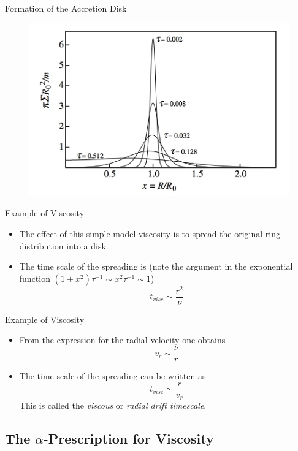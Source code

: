 \documentclass{beamer}
\begin{document}
\begin{frame}{Formation of the Accretion Disk}
	\begin{center}
      \begin{figure}
      	\includegraphics[scale=0.3] {figures/diskRadialStructure.jpeg}
      \end{figure}
	\end{center}	
\end{frame}

\begin{frame}{Example of Viscosity}
\begin{itemize}
	\item The effect of this simple model viscosity is to spread the original ring distribution into a disk.
	\pause 
	\item The time scale of the spreading is (note the argument in the exponential function $(1+x^2)\tau^{-1} \sim x^2 \tau^{-1} \sim 1$)
	\[t_{visc} \sim \frac{r^2}{\nu}\] 
\end{itemize}
\end{frame}

\begin{frame}{Example of Viscosity}
\begin{itemize}
	\item From the expression for the radial velocity one obtains
	\[v_r \sim \frac{\nu}{r}\]
	\pause
	\item The time scale of the spreading can be written as
	\[t_{visc} \sim \frac{r}{v_r}\] 
	This is called the \textit{viscous} or \textit{radial drift timescale}.
\end{itemize}	
\end{frame}

\subsection{The $\alpha$-Prescription for Viscosity}    
\end{document}
